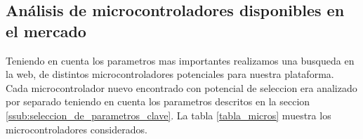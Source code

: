 
\subsection{Análisis de microcontroladores disponibles en el mercado} %
\label{it1:sub:analisis_de_microcontroladores}

Teniendo en cuenta los parametros mas importantes realizamos una busqueda en la web, de distintos microcontroladores potenciales para nuestra plataforma. Cada microcontrolador nuevo encontrado con potencial de seleccion era analizado por separado teniendo en cuenta los parametros descritos en la seccion \ref{ssub:seleccion_de_parametros_clave}. La tabla \ref{tabla_micros} muestra los microcontroladores considerados.

